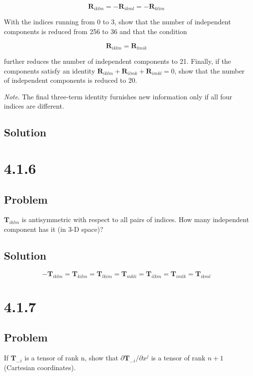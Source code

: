 \documentclass[12pt]{article}
\begin{document}
\[
    \textbf{R}_{iklm} = - \textbf{R}_{ikml} = - \textbf{R}_{klim}
\]

With the indices running from 0 to 3, show that the number of independent components
is reduced from 256 to 36 and that the condition

\[
    \textbf{R}_{iklm} = \textbf{R}_{lmik}
\]

further reduces the number of independent components to 21. Finally, if the components
satisfy an identity \(\textbf{R}_{iklm} + \textbf{R}_{ilmk} + \textbf{R}_{imkl} = 0\),
show that the number of independent components is reduced to 20.

\textit{Note}. The final three-term identity furnishes new
information only if all four indices are different.

\subsection{Solution}



\newpage
\section{4.1.6}

\subsection{Problem}

\(\textbf{T}_{iklm}\) is antisymmetric with respect to all pairs of indices. How many
independent component has it (in 3-D space)?

\subsection{Solution}

\[
    - \textbf{T}_{iklm}
    = \textbf{T}_{kilm}
    = \textbf{T}_{lkim}
    = \textbf{T}_{mkli}
    = \textbf{T}_{ilkm}
    = \textbf{T}_{imlk}
    = \textbf{T}_{ikml}
\]

\newpage
\section{4.1.7}

\subsection{Problem}

If \(\textbf{T}_{\ldots i}\) is a tensor of rank n, show that
\(\partial \textbf{T}_{\ldots i} / \partial x^j\) is a tensor of rank \(n + 1\)
(Cartesian coordinates).
\end{document}
